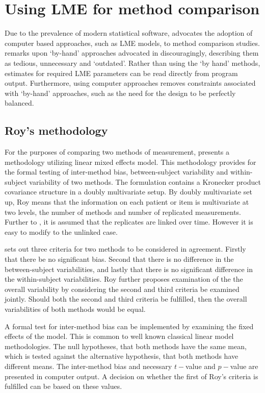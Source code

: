 \newpage
\section{Using LME for method comparison}
Due to the prevalence of modern statistical software, \citet{BXC2008} advocates the adoption of computer based approaches, such as LME models, to method comparison studies. \citet{BXC2008} remarks upon `by-hand' approaches advocated in \citet{BA99} discouragingly, describing them as tedious, unnecessary and `outdated'. Rather than using the `by hand' methods, estimates for required LME parameters can be read directly from program output. Furthermore, using computer approaches removes constraints associated with `by-hand' approaches, such as the need for the design to be perfectly balanced.

\subsection{Roy's methodology}

For the purposes of comparing two methods of measurement, \citet{roy} presents a methodology utilizing linear mixed effects model. This methodology provides for the formal testing of inter-method bias, between-subject variability and within-subject variability of two methods. The formulation contains a Kronecker product covariance structure in a doubly multivariate setup. By doubly multivariate set up, Roy means that the information on each patient or item is multivariate at two levels, the number of methods and number of replicated measurements. Further to \citet{lam}, it is assumed that the replicates are linked over time. However it is easy to modify to the unlinked case.

\citet{roy} sets out three criteria for two methods to be considered in agreement. Firstly that there be no significant bias. Second that there is no difference in the between-subject variabilities, and lastly that there is no significant difference in the within-subject variabilities. Roy further proposes examination of the the overall variability by considering the second and third criteria be examined jointly. Should both the second and third criteria be fulfilled, then the overall variabilities of both methods would be equal.

A formal test for inter-method bias can be implemented by examining the fixed effects of the model. This is common to well known classical linear model methodologies. The null hypotheses, that both methods have the same mean, which is tested against the alternative hypothesis, that both methods have different means.
The inter-method bias and necessary $t-$value and $p-$value are presented in computer output. A decision on whether the first of Roy's criteria is fulfilled can be based on these values.

